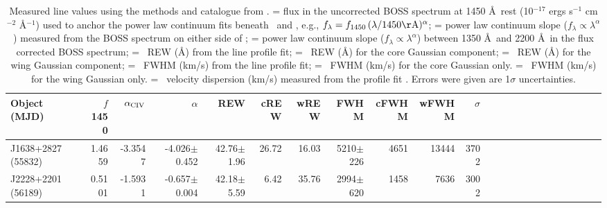 \documentclass[a4paper,fleqn,usenatbib]{mnras}
\begin{document}
\begin{table}
\begin{tabular}{ l rrrr rrrr rrrr rrrr rrrr rr|}
\hline
\hline 
Object (MJD)               & $f$1450 & $\alpha_{\rm C IV}$    & $\alpha$    & REW                       & cREW   &  wREW  & FWHM              & cFWHM  &  wFWHM  & $\sigma$     \\
\hline 
J1638+2827 (55832) & 1.4659    & -3.3547             & -4.026$\pm$0.452 & 42.76$\pm$1.96  & 26.72  & 16.03  & 5210$\pm$226 & 4651      & 13444    & 3702          \\
J2228+2201 (56189) & 0.5101    & -1.5931             & -0.657$\pm$0.004 & 42.18$\pm$5.59  &  6.42   & 35.76  & 2994$\pm$620 & 1458      &   7636    & 3002           \\
\hline
\end{tabular}
 \caption{
Measured line values using the methods and catalogue from \citet{Hamann2017}. 
 = flux in the uncorrected BOSS spectrum at 1450 \AA\ rest (10$^{-17}$ ergs s$^{-1}$ cm$^{-2}$ \AA$^{-1}$) used to anchor the power law continuum fits beneath \civ\ and \nv , 
                                     e.g., $f_{\lambda} = f_{1450}\, (\lambda /1450{\rm \AA})^{\alpha}$; 
 = power law continuum slope ($f_{\lambda}\propto \lambda^{\alpha}$) measured from the BOSS spectrum on either side of \civ ; 
\noindent {\tt $\alpha$}                            = power law continuum slope ($f_{\lambda}\propto \lambda^{\alpha}$) between 1350 \AA\ and 2200 \AA\ in the flux corrected BOSS spectrum; 
 = \civ\ REW (\AA ) from the line profile fit;
 = \civ\ REW (\AA ) for the core Gaussian component;
 = \civ\ REW (\AA ) for the wing Gaussian component; 
 = \civ\ FWHM (km/s) from the line profile fit; 
 = \civ\ FWHM (km/s) for the core Gaussian only.
 = \civ\ FWHM (km/s) for the wing Gaussian only.
\noindent {\tt $\sigma$} = \civ\ velocity dispersion (km/s) measured from the profile fit \citep{Peterson2004}.
Errors were given are 1$\sigma$ uncertainties. 
} 
 \label{tab:Ham17_lines}
\end{table}
\end{document}
